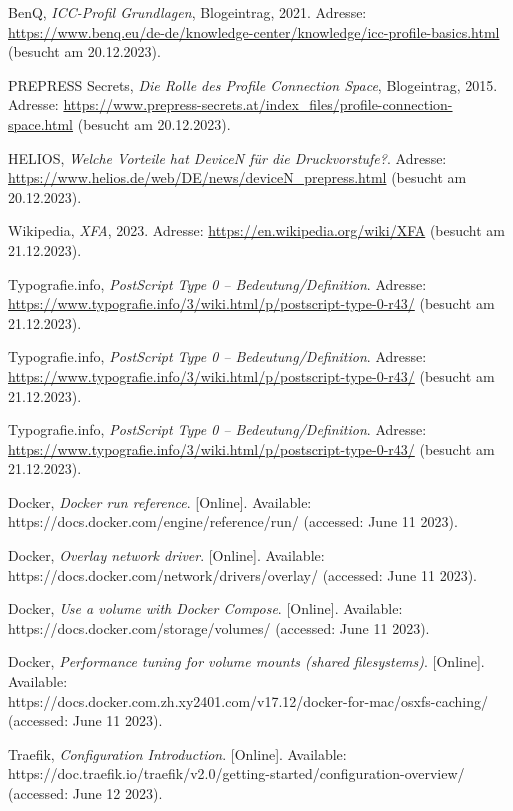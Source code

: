 \begin{referenceslist}
	\itemk BenQ, \emph{ICC-Profil Grundlagen}, Blogeintrag, 2021. Adresse: \url{https://www.benq.eu/de-de/knowledge-center/knowledge/icc-profile-basics.html} (besucht am 20.12.2023).
	
	\iteml PREPRESS Secrets, \emph{Die Rolle des Profile Connection Space}, Blogeintrag, 2015. Adresse: \url{https://www.prepress-secrets.at/index_files/profile-connection-space.html} (besucht am 20.12.2023).
	
	\itemm HELIOS, \emph{Welche Vorteile hat DeviceN für die Druckvorstufe?}. Adresse: \url{https://www.helios.de/web/DE/news/deviceN_prepress.html} (besucht am 20.12.2023).
	
	\itemn Wikipedia, \emph{XFA}, 2023. Adresse: \url{https://en.wikipedia.org/wiki/XFA} (besucht am 21.12.2023).
	
	\itemo Typografie.info, \emph{PostScript Type 0 – Bedeutung/Definition}. Adresse: \url{https://www.typografie.info/3/wiki.html/p/postscript-type-0-r43/} (besucht am 21.12.2023).
	
	\itemp Typografie.info, \emph{PostScript Type 0 – Bedeutung/Definition}. Adresse: \url{https://www.typografie.info/3/wiki.html/p/postscript-type-0-r43/} (besucht am 21.12.2023).
	
	\itemq Typografie.info, \emph{PostScript Type 0 – Bedeutung/Definition}. Adresse: \url{https://www.typografie.info/3/wiki.html/p/postscript-type-0-r43/} (besucht am 21.12.2023).
	
	\itemr Docker, \emph{Docker run reference}. [Online]. Available: \\
	https://docs.docker.com/engine/reference/run/  (accessed: June 11 2023).
	
	\items Docker, \emph{Overlay network driver}. [Online]. Available: \\
	https://docs.docker.com/network/drivers/overlay/  (accessed: June 11 2023).
	
	\itemt Docker, \emph{Use a volume with Docker Compose}. [Online]. Available: \\
	https://docs.docker.com/storage/volumes/  (accessed: June 11 2023).
	
	\itemu Docker, \emph{Performance tuning for volume mounts (shared filesystems)}. [Online]. Available: \\
	https://docs.docker.com.zh.xy2401.com/v17.12/docker-for-mac/osxfs-caching/  (accessed: June 11 2023).
	
	\itemv Traefik, \emph{Configuration Introduction}. [Online]. Available: \\
	https://doc.traefik.io/traefik/v2.0/getting-started/configuration-overview/  (accessed: June 12 2023).
\end{referenceslist}
